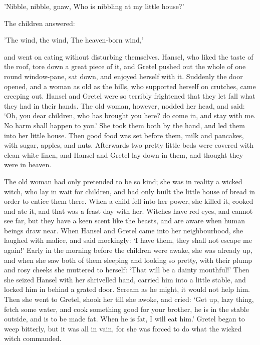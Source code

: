 \documentclass[oneside,11pt]{memoir} %
\begin{document}
	'Nibble, nibble, gnaw,
	Who is nibbling at my little house?'
	
	The children answered:
	
	'The wind, the wind,
	The heaven-born wind,'
	
	and went on eating without disturbing themselves. Hansel, who liked the taste of the roof, tore down a great piece of it, and Gretel pushed out the whole of one round window-pane, sat down, and enjoyed herself with it. Suddenly the door opened, and a woman as old as the hills, who supported herself on crutches, came creeping out. Hansel and Gretel were so terribly frightened that they let fall what they had in their hands. The old woman, however, nodded her head, and said: `Oh, you dear children, who has brought you here? do come in, and stay with me. No harm shall happen to you.' She took them both by the hand, and led them into her little house. Then good food was set before them, milk and pancakes, with sugar, apples, and nuts. Afterwards two pretty little beds were covered with clean white linen, and Hansel and Gretel lay down in them, and thought they were in heaven.
	
	The old woman had only pretended to be so kind; she was in reality a wicked witch, who lay in wait for children, and had only built the little house of bread in order to entice them there. When a child fell into her power, she killed it, cooked and ate it, and that was a feast day with her. Witches have red eyes, and cannot see far, but they have a keen scent like the beasts, and are aware when human beings draw near. When Hansel and Gretel came into her neighbourhood, she laughed with
	malice, and said mockingly: `I have them, they shall not escape me again!' Early in the morning before the children were awake, she was already up, and when she saw both of them sleeping and looking so pretty, with their plump and rosy cheeks she muttered to herself: `That will be a dainty mouthful!' Then she seized Hansel with her shrivelled hand, carried him into a little stable, and locked him in behind a grated door. Scream as he might, it would not help him. Then she went to
	Gretel, shook her till she awoke, and cried: `Get up, lazy thing, fetch some water, and cook something good for your brother, he is in the stable outside, and is to be made fat. When he is fat, I will eat him.' Gretel began to weep bitterly, but it was all in vain, for she was forced to do what the wicked witch commanded.
	
\end{document}
